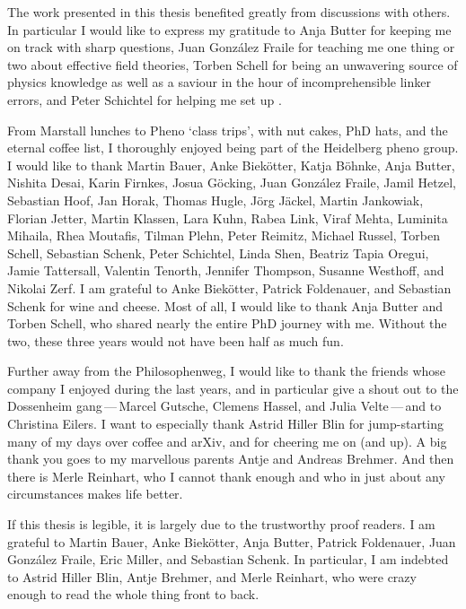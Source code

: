 The work presented in this thesis benefited greatly from discussions
with others. In particular I would like to express my gratitude to
Anja Butter for keeping me on track with sharp questions, Juan
Gonz\'alez Fraile for teaching me one thing or two about effective
field theories, Torben Schell for being an unwavering source of physics
knowledge as well as a saviour in the hour of incomprehensible linker
errors, and Peter Schichtel for helping me set up
.

From Marstall lunches to Pheno `class trips', with nut cakes, PhD
hats, and the eternal coffee list,
%
I thoroughly enjoyed being part of the Heidelberg pheno group.
%
%
I would like to thank Martin
Bauer, Anke Biek\"otter, Katja B\"ohnke, Anja Butter, Nishita Desai,
Karin Firnkes, Josua G\"ocking, Juan Gonz\'alez Fraile, Jamil Hetzel,
Sebastian Hoof, Jan Horak, Thomas Hugle, J\"org J\"ackel, Martin
Jankowiak, Florian Jetter, Martin Klassen, Lara Kuhn, Rabea Link,
Viraf Mehta, Luminita Mihaila, Rhea Moutafis, Tilman Plehn, Peter
Reimitz, Michael Russel, Torben Schell, Sebastian Schenk, Peter
Schichtel, Linda Shen, Beatriz Tapia Oregui, Jamie Tattersall,
Valentin Tenorth, Jennifer Thompson, Susanne Westhoff, and Nikolai
Zerf. I am grateful to Anke Biek\"otter, Patrick Foldenauer, and
Sebastian Schenk for wine and cheese. Most of
all, I would like to thank Anja Butter and Torben Schell, who shared
nearly the entire PhD journey with me. Without the two, these three
years would not have been half as much fun.

Further away from the Philosophenweg, I would like to thank the
friends whose company I enjoyed during the last years, and in
particular give a shout out to the Dossenheim gang\,---\,Marcel
Gutsche, Clemens Hassel, and Julia Velte\,---\,and to Christina
Eilers. I want to especially thank Astrid Hiller Blin for
jump-starting many of my days over coffee and arXiv, and for cheering
me on (and up). A big thank you goes to my marvellous parents Antje
and Andreas Brehmer. And then there is Merle Reinhart, who I cannot
thank enough and who in just about any circumstances makes life
better.

If this thesis is legible, it is largely due to the trustworthy proof
readers. I am grateful to Martin Bauer, Anke Biek\"otter, Anja Butter,
Patrick Foldenauer, Juan Gonz\'alez Fraile, Eric Miller, and Sebastian
Schenk. In particular, I am indebted to Astrid Hiller Blin, Antje
Brehmer, and Merle Reinhart, who were crazy enough to read the whole
thing front to back.

